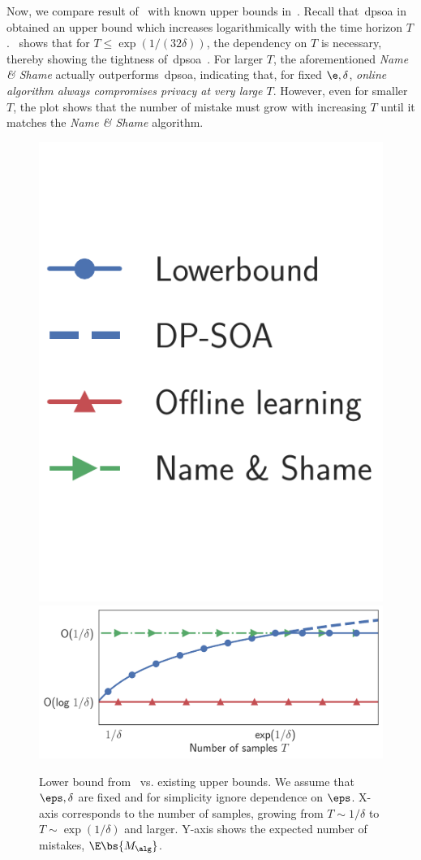 Now, we compare result of~ with known upper bounds in~. Recall that~\Gls{dpsoa} in \citet{golowich2021littlestone} obtained an upper bound which increases logarithmically with the time horizon \(T\).~ shows that for \(T \leq \exp(1 / (32\delta))\), the dependency on \(T\) is necessary, thereby showing the tightness of~\Gls{dpsoa}~\citep{golowich2021littlestone}. For  larger \(T\), the aforementioned \emph{Name \& Shame} actually outperforms~\Gls{dpsoa}, indicating that, for fixed \(\e, \delta\), \emph{online algorithm always compromises privacy at very large \(T\)}. However, even for smaller \(T\), the plot shows that the number of mistake must grow with increasing \(T\) until it matches the \emph{Name \& Shame} algorithm.

\begin{figure}[t]\centering\vspace{-20pt}
\includegraphics[width=0.2\linewidth]{chapters/dp/content/figures/legend.pdf}\quad\quad
\includegraphics[width=0.6\linewidth]{chapters/dp/content/figures/lb_comp_markers_no_leg.pdf}
\caption{\small Lower bound from~ vs. existing upper bounds. We assume that \(\eps, \delta\) are fixed and for simplicity ignore dependence on \(\eps\). X-axis corresponds to the number of samples, growing from \(T \sim 1/\delta\) to \(T \sim \exp(1/\delta)\) and larger. Y-axis shows the expected number of mistakes, \(\E \bs{M_{\alg}}\).\vspace{-15pt}}
\label{fig:lower-bound}
\end{figure}

